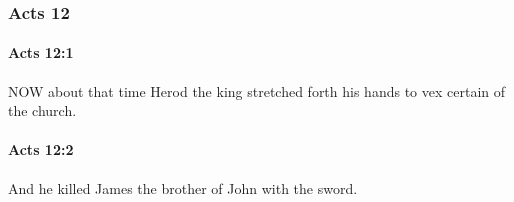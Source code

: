 	\subsubsection{Acts 12} %
		\label{ACTS-12}
		
		\paragraph{Acts 12:1} %
			\label{ACTS-12-1}

			NOW about that time Herod the king stretched forth his hands to vex certain of the church.

			\begin{framed}
			\scriptsize
				\begin{compactdesc}
					\item[SBLG] 
				\end{compactdesc}
			\end{framed}

		\paragraph{Acts 12:2} %
			\label{ACTS-12-2}

			And he killed James the brother of John with the sword.

